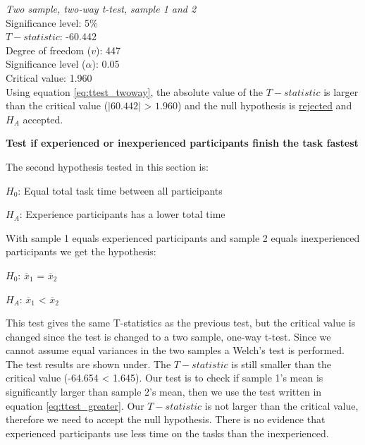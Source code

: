  \begin{center}
	\begin{tcolorbox}[width=0.8\textwidth]
		\centering
		\textit{Two sample, two-way t-test, sample 1 and 2}\\
		Significance level: 5\%  \\[0.5cm]
		
		$T-statistic$: -60.442 \\
		Degree of freedom ($v$): 447 \\ %
		Significance level ($\alpha$): 0.05 \\
		Critical value: 1.960\\[0.2cm]
		
		Using equation \ref{eq:ttest_twoway}, the absolute value of the $T-statistic$ is larger than the critical value ($|60.442|$ > $1.960$) and the null hypothesis is \underline{rejected} and $H_A$ accepted.\\[0.5cm]

	\end{tcolorbox} 
\end{center}

\vspace{0.7cm}

\textbf{Test if experienced or inexperienced participants finish the task fastest} 

The second hypothesis tested in this section is:\newline

\centerline{$H_{0}$: Equal total task time between all participants}
\centerline{$H_{A}$: Experience participants has a lower total time}

With sample 1 equals experienced participants and sample 2 equals inexperienced participants we get the hypothesis:\\[0.2cm]

\centerline{$H_{0}$: $\overline{x}_1$ = $\overline{x}_2$}
\centerline{$H_{A}$: $\overline{x}_1$ < $\overline{x}_2$}

This test gives the same T-statistics as the previous test, but the critical value is changed since the test is changed to a two sample, one-way t-test. Since we cannot assume equal variances in the two samples a Welch's test is performed. The test results are shown under. The $T-statistic$ is still smaller than the critical value (-64.654 < 1.645). Our test is to check if sample 1's mean is significantly larger than sample 2's mean, then we use the test written in equation \ref{eq:ttest_greater}. Our $T-statistic$ is not larger than the critical value, therefore we need to accept the null hypothesis. There is no evidence that experienced participants use less time on the tasks than the inexperienced. \\[0.2cm]


